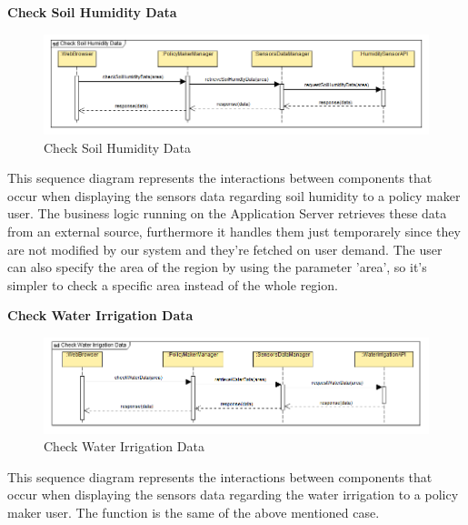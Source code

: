 \documentclass[table, 12pt]{article}
\begin{document}
\newpage
\textbf{Check Soil Humidity Data}
\begin{center}
    \begin{figure}[H]
        \includegraphics[scale=0.7, center]{assets/SequenceDiagram/CheckSoilHumidityData.png}
        \caption{Check Soil Humidity Data}
        \label{fig: humidity}
    \end{figure}
\end{center}
This sequence diagram represents the interactions between components that occur when displaying the sensors data regarding soil humidity to a policy maker user.
The business logic running on the Application Server retrieves these data from an external source, furthermore it handles them just temporarely since they are not modified by our system and they're fetched on user demand.   
The user can also specify the area of the region by using the parameter 'area', so it's simpler to check a specific area instead of the whole region.

\newpage
\textbf{Check Water Irrigation Data} 
\begin{center}
    \begin{figure}[H]
        \includegraphics[scale=0.7, center]{assets/SequenceDiagram/CheckWaterIrrigationData.png}
        \caption{Check Water Irrigation Data}
        \label{fig: irrigation}
    \end{figure}
\end{center}
This sequence diagram represents the interactions between components that occur when displaying the sensors data regarding the water irrigation to a policy maker user.
The function is the same of the above mentioned case.
\end{document}
